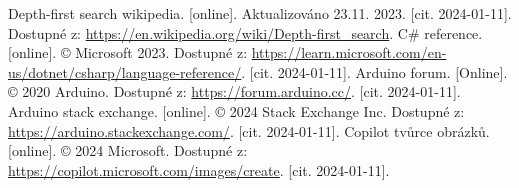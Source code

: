 \documentclass[12pt, a4paper,
twoside        %
]{report}
\let\oldchapter\chapter
\renewcommand{\chapter}{
\clearpage
\pagestyle{plain}
\oldchapter
}
\begin{document}
 \renewcommand{\bibname}{Seznam použitých zdrojů}
	\begin{thebibliography}{99}
		 Depth-first search wikipedia. [online]. Aktualizováno 23.11. 2023. [cit. 2024-01-11]. Dostupné z: \url{https://en.wikipedia.org/wiki/Depth-first_search}. 
		 C\# reference. [online]. © Microsoft 2023. Dostupné z: \url{https://learn.microsoft.com/en-us/dotnet/csharp/language-reference/}. [cit. 2024-01-11].
		 Arduino forum. [Online]. © 2020 Arduino. Dostupné z: \url{https://forum.arduino.cc/}. [cit. 2024-01-11].
		 Arduino stack exchange. [online]. © 2024 Stack Exchange Inc. Dostupné z: \url{https://arduino.stackexchange.com/}. [cit. 2024-01-11].
         Copilot tvůrce obrázků. [online]. © 2024 Microsoft. Dostupné z: \url{https://copilot.microsoft.com/images/create}. [cit. 2024-01-11].
	\end{thebibliography}
	
	\listoffigures
	
	
	
	
	
	
	
\end{document}
